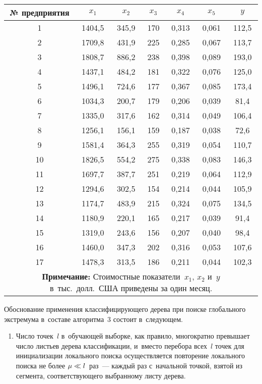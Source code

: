 \begin{multicols}{2}
\begin{table*}
\begin{center}
\begin{tabular}{|c|c|c|c|c|c||c|} 
\hline
№ предприятия & $x_1$ & $x_2$ & $x_3$ & $x_4$ & $x_5$ & $y$ \\
\hline 
\hphantom{9}1 & 1404,5 &345,9& 170 &0,313 & 0,061 & 112,5 \\
\hphantom{9}2 & 1709,8 &431,9& 225 &0,285 & 0,067 & 113,7 \\
\hphantom{9}3 & 1808,7 &886,2& 238 &0,398 & 0,089 & 193,0 \\
\hphantom{9}4 & 1437,1 &484,2& 181 &0,322 & 0,076 & 125,0 \\
\hphantom{9}5 & 1496,1 &724,6& 177 &0,367 & 0,085 & 173,4 \\
\hphantom{9}6 & 1034,3 &200,7& 179 &0,206 & 0,039 & \hphantom{1}81,4 \\
\hphantom{9}7 & 1335,0 &317,6& 162 &0,314 & 0,049 & 106,4 \\
\hphantom{9}8 & 1256,1 &156,1& 159 &0,187 & 0,038 & \hphantom{1}72,6 \\
\hphantom{9}9 & 1581,4 &364,3& 255 &0,319 & 0,054 & 110,7 \\
10& 1826,5 &554,2& 275 &0,338 & 0,083 & 146,3 \\
11& 1697,7 &387,7& 251 &0,219 & 0,064 & 112,9 \\
12& 1294,6 &302,5& 154 &0,214 & 0,044 & 105,9 \\
13& 1174,7 &483,9& 215 &0,324 & 0,075 & 134,5 \\
14& 1180,9 &220,1& 165 &0,217 & 0,039 & \hphantom{1}91,4 \\
15& 1319,0 &243,6& 156 &0,207 & 0,040 & \hphantom{1}98,4 \\
16& 1460,0 &347,3& 202 &0,316 & 0,053 & 107,6 \\
17& 1478,3 &313,5& 186 &0,211 & 0,044 & 102,3 \\
\hline
\multicolumn{7}{p{100mm}}{\footnotesize \hspace*{2mm}\textbf{Примечание:} 
Стоимостные показатели~$x_1$, $x_2$ и~$y$ в~тыс.\
 долл.\ США приведены за один месяц.}
\end{tabular}
\end{center}
\end{table*}

Обоснование применения классифицирующего дерева при 
поиске глобального экстремума в~составе алгоритма~3 состоит в~следующем.
\begin{enumerate}[1.]
\item  Число точек~$l$ в~обучающей выборке, как правило, многократно 
превышает число листьев дерева классификации, и~вместо перебора всех~$l$ точек 
для инициализации локального поиска осуществляется повторение локального 
поиска не более $\mu\hm \ll l$~раз~--- каждый раз с~начальной точкой, 
взятой из сегмента, соответствующего выбранному листу дерева.


\end{enumerate}
\end{multicols}
